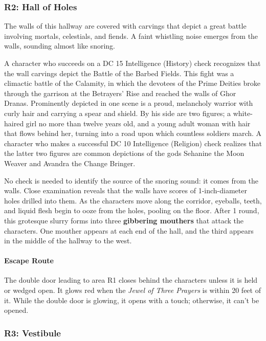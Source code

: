 \documentclass[a4paper, 11pt, bg=full, twocolumn, nooutline]{dndbook}
\begin{document}
\subsubsection{R2: Hall of Holes}

\begin{DndReadAloud}
The walls of this hallway are covered with carvings that depict a great battle involving mortals, celestials, and fiends. A faint whistling noise emerges from the walls, sounding almost like snoring.
\end{DndReadAloud}

A character who succeeds on a DC 15 Intelligence (History) check recognizes that the wall carvings depict the Battle of the Barbed Fields. This fight was a climactic battle of the Calamity, in which the devotees of the Prime Deities broke through the garrison at the Betrayers' Rise and reached the walls of Ghor Dranas. Prominently depicted in one scene is a proud, melancholy warrior with curly hair and carrying a spear and shield. By his side are two figures; a white-haired girl no more than twelve years old, and a young adult woman with hair that flows behind her, turning into a road upon which countless soldiers march. A character who makes a successful DC 10 Intelligence (Religion) check realizes that the latter two figures are common depictions of the gods Sehanine the Moon Weaver and Avandra the Change Bringer.

No check is needed to identify the source of the snoring sound: it comes from the walls. Close examination reveals that the walls have scores of 1-inch-diameter holes drilled into them. As the characters move along the corridor, eyeballs, teeth, and liquid flesh begin to ooze from the holes, pooling on the floor. After 1 round, this grotesque slurry forms into three \textbf{gibbering mouthers} that attack the characters. One mouther appears at each end of the hall, and the third appears in the middle of the hallway to the west.

\paragraph{Escape Route}

The double door leading to area R1 closes behind the characters unless it is held or wedged open. It glows red when the \textit{Jewel of Three Prayers} is within 20 feet of it. While the double door is glowing, it opens with a touch; otherwise, it can't be opened.

\subsubsection{R3: Vestibule}
\end{document}
